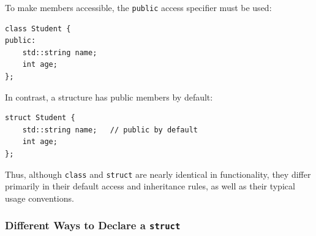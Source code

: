 \documentclass[10pt]{article}
\begin{document}
To make members accessible, the \verb|public| access specifier must be used:

\begin{verbatim}
class Student {
public:
    std::string name;
    int age;
};
\end{verbatim}

In contrast, a structure has public members by default:

\begin{verbatim}
struct Student {
    std::string name;   // public by default
    int age;
};
\end{verbatim}

Thus, although \verb|class| and \verb|struct| are nearly identical in functionality, they differ primarily in their default access and inheritance rules, as well as their typical usage conventions.

\newpage

\subsubsection{Different Ways to Declare a \texttt{struct}}
\end{document}
